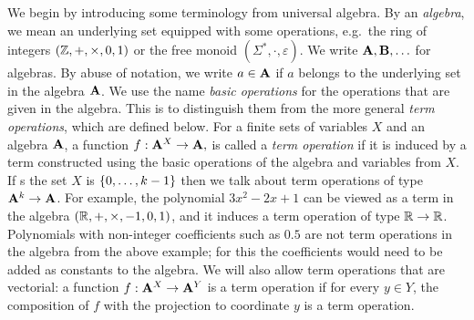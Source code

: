  We begin by introducing some terminology from universal algebra. By an \emph{algebra}, we mean an underlying set equipped with some  operations, e.g.~the ring of integers $(\mathbb Z, + , \times, 0, 1)$ or the free monoid $(\Sigma^*, \cdot, \varepsilon)$. We write $\mathbf{A}, \mathbf{B}, \ldots$ for algebras. By abuse of notation, we write $a \in \mathbf{A}$ if $a$ belongs to the underlying set in the algebra $\mathbf{A}$. 
We use the name \emph{basic operations} for the operations that are given in the algebra. This is to distinguish them from the more general \emph{term operations}, which are defined below.
        For a finite sets of variables $X$ and an algebra $\mathbf{A}$, a function $f : \mathbf{A}^X \to \mathbf{A},$
            is called a \emph{term operation} if it is induced by a  term  constructed using the basic operations of the algebra and variables from $X$.  If s the set $X$ is $\{0,\ldots,k-1\}$ then we talk about term operations of type $\mathbf{A}^k \to \mathbf{A}$.
        For example, the polynomial $3x^2 -2x+1$ can be viewed as a term in the algebra
            $(\mathbb R, +,\times, -1,0,1)$,
        and it induces a term operation of type $\mathbb R \to \mathbb R$. 
        Polynomials with non-integer coefficients such as $0.5$  are not term operations in the algebra from the above example; for this the coefficients would need to be added as constants to the algebra. We will also allow term operations that are vectorial: a function $f : \mathbf{A}^X \to \mathbf{A}^Y$ is a term operation if for every $y \in Y$, the composition of $f$ with the projection to coordinate $y$ is a term operation. 
        

